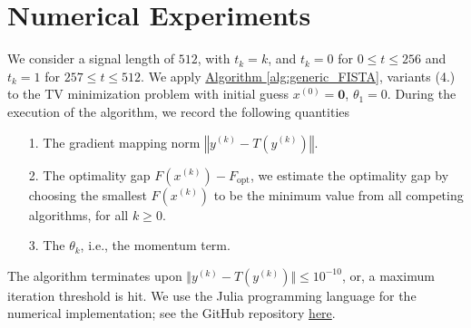 \documentclass[]{article}
\theoremstyle{definition}
\numberwithin{equation}{subsection}
\begin{document}

\section{Numerical Experiments}\label{sec:numerics}
    We consider a signal length of $512$, with $t_k = k$, and $t_k = 0$ for $0\le t \le 256$ and $t_k = 1$ for $257\le t\le 512$. 
    We apply \hyperref[alg:generic_FISTA]{Algorithm \ref*{alg:generic_FISTA}}, variants (4.) to the TV minimization problem with initial guess $x^{(0)} = \mathbf 0$, $\theta_1 = 0$. 
    During the execution of the algorithm, we record the following quantities 
    \begin{itemize}
        \item [1.] The gradient mapping norm $\left\Vert y^{(k)} - T(y^{(k)})\right\Vert$. 
        \item [2.] The optimality gap $F(x^{(k)}) - F_{\text{opt}}$, we estimate the optimality gap by choosing the smallest $F(x^{(k)})$ to be the minimum value from all competing algorithms, for all $k\ge 0$. 
        \item [3.] The $\theta_k$, i.e., the momentum term. 
    \end{itemize}
    The algorithm terminates upon $\Vert y^{(k)} - T(y^{(k)}) \Vert \le 10^{-10}$, or, a maximum iteration threshold is hit. 
    We use the Julia programming language \cite{bezanson_julia_2017} for the numerical implementation; see the GitHub repository \href{https://github.com/iluvjava/Proximal-Gradient/tree/main/applications}{here}.
\end{document}
